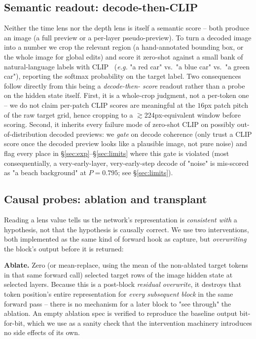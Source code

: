 \documentclass[10pt,twocolumn]{article}
\newcommand{\eg}{\emph{e.g.}}
\begin{document}
\subsection{Semantic readout: decode-then-CLIP}\label{sec:readout}
Neither the time lens nor the depth lens is itself a semantic score --
both produce an image (a full preview or a per-layer pseudo-preview).
To turn a decoded image into a number we crop the relevant region
(a hand-annotated bounding box, or the whole image for global edits) and
score it zero-shot against a small bank of natural-language labels with
CLIP~\citep{radford2021clip} (\eg{} "a red car" vs.\ "a blue car" vs.\ "a
green car"), reporting the softmax probability on the target label.
Two consequences follow directly from this being a \emph{decode-then-
score} readout rather than a probe on the hidden state itself. First, it
is a whole-crop judgment, not a per-token one -- we do not claim
per-patch CLIP scores are meaningful at the $16$px patch pitch of the raw
target grid, hence cropping to a $\gtrsim$224px-equivalent window before
scoring. Second, it inherits every failure mode of zero-shot CLIP on
possibly out-of-distribution decoded previews: we \emph{gate} on decode
coherence (only trust a CLIP score once the decoded preview looks like a
plausible image, not pure noise) and flag every place in
\S\ref{sec:exp}--\S\ref{sec:limits} where this gate is violated (most
consequentially, a very-early-layer, very-early-step decode of
"noise" is mis-scored as "a beach background" at $P{=}0.795$; see
\S\ref{sec:limits}).

\subsection{Causal probes: ablation and transplant}\label{sec:interventions}
Reading a lens value tells us the network's representation is
\emph{consistent with} a hypothesis, not that the hypothesis is
causally correct. We use two interventions, both implemented as the same
kind of forward hook as capture, but \emph{overwriting} the block's
output before it is returned:

\textbf{Ablate.} Zero (or mean-replace, using the mean of the
non-ablated target tokens in that same forward call) selected target
rows of the image hidden state at selected layers. Because this is a
post-block \emph{residual overwrite}, it destroys that token position's
entire representation for \emph{every subsequent block} in the same
forward pass -- there is no mechanism for a later block to "see through"
the ablation. An empty ablation spec is verified to reproduce the
baseline output bit-for-bit, which we use as a sanity check that the
intervention machinery introduces no side effects of its own.
\end{document}
